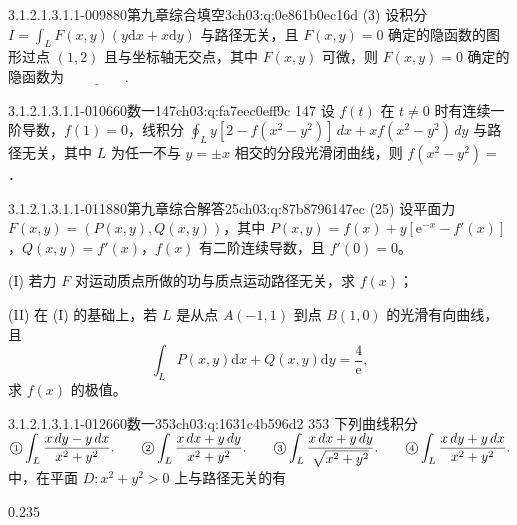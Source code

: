 \begin{q}{3.1.2.1.3.1.1-009}{880第九章综合填空3}{ch03:q:0e861b0ec16d}
(3) 设积分 $\displaystyle I=\int_L F(x,y)(y\mathrm{d}x+x\mathrm{d}y)$ 与路径无关，且 $F(x,y)=0$ 确定的隐函数的图形过点 $(1,2)$ 且与坐标轴无交点，其中 $F(x,y)$ 可微，则 $F(x,y)=0$ 确定的隐函数为 $\underline{\hspace{4em}}$.
\end{q}

\begin{q}{3.1.2.1.3.1.1-010}{660数一147}{ch03:q:fa7eec0eff9c}
147 设 $f(t)$ 在 $t \neq 0$ 时有连续一阶导数，$f(1)=0$，线积分 $\displaystyle \oint_L y[2-f(x^2-y^2)]\,dx + x f(x^2-y^2)\,dy$ 与路径无关，其中 $L$ 为任一不与 $y=\pm x$ 相交的分段光滑闭曲线，则 $f(x^2-y^2)=$ \underline{\hspace{4em}}．
\end{q}

\begin{q}{3.1.2.1.3.1.1-011}{880第九章综合解答25}{ch03:q:87b8796147ec}
(25) 设平面力 $F(x,y)=(P(x,y),Q(x,y))$，其中 $P(x,y)=f(x)+y[\mathrm{e}^{-x}-f'(x)]$，$Q(x,y)=f'(x)$，$f(x)$ 有二阶连续导数，且 $f'(0)=0$。

(I) 若力 $F$ 对运动质点所做的功与质点运动路径无关，求 $f(x)$；

(II) 在 (I) 的基础上，若 $L$ 是从点 $A(-1,1)$ 到点 $B(1,0)$ 的光滑有向曲线，且
\[\int_L P(x,y)\mathrm{d}x+Q(x,y)\mathrm{d}y=\frac{4}{\mathrm{e}},\]
求 $f(x)$ 的极值。
\end{q}

\begin{q}{3.1.2.1.3.1.1-012}{660数一353}{ch03:q:1631c4b596d2}
353 下列曲线积分
$\displaystyle \text{\textcircled{\scriptsize 1}}\int_L \frac{x\,dy-y\,dx}{x^2+y^2}. \qquad \text{\textcircled{\scriptsize 2}}\int_L \frac{x\,dx+y\,dy}{x^2+y^2}. \qquad \text{\textcircled{\scriptsize 3}}\int_L \frac{x\,dx+y\,dy}{\sqrt{x^2+y^2}}. \qquad \text{\textcircled{\scriptsize 4}}\int_L \frac{x\,dy+y\,dx}{x^2+y^2}.$
中，在平面 $D:x^2+y^2>0$ 上与路径无关的有
\begin{opts}{0.235}
\hfill{}\hfill{}\hfill{}
\end{opts}
\end{q}

